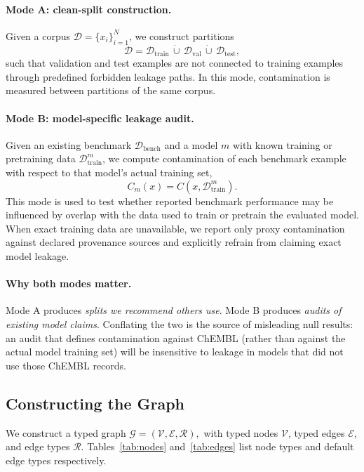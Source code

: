 \documentclass[11pt]{article}
\begin{document}
\paragraph{Mode A: clean-split construction.}
Given a corpus \(\mathcal{D} = \{x_i\}_{i=1}^{N}\), we construct partitions
\[
\mathcal{D}
=
\mathcal{D}_{\mathrm{train}}
\,\dot\cup\,
\mathcal{D}_{\mathrm{val}}
\,\dot\cup\,
\mathcal{D}_{\mathrm{test}},
\]
such that validation and test examples are not connected to training examples through predefined forbidden leakage paths. In this mode, contamination is measured between partitions of the same corpus.

\paragraph{Mode B: model-specific leakage audit.}
Given an existing benchmark \(\mathcal{D}_{\mathrm{bench}}\) and a model \(m\) with known training or pretraining data \(\mathcal{D}^{m}_{\mathrm{train}}\), we compute contamination of each benchmark example with respect to that model's actual training set,
\[
C_m(x) = C(x, \mathcal{D}^{m}_{\mathrm{train}}).
\]
This mode is used to test whether reported benchmark performance may be influenced by overlap with the data used to train or pretrain the evaluated model. When exact training data are unavailable, we report only proxy contamination against declared provenance sources and explicitly refrain from claiming exact model leakage.

\paragraph{Why both modes matter.}
Mode A produces \emph{splits we recommend others use}. Mode B produces \emph{audits of existing model claims}. Conflating the two is the source of misleading null results: an audit that defines contamination against ChEMBL (rather than against the actual model training set) will be insensitive to leakage in models that did not use those ChEMBL records.

\subsection{Constructing the Graph}

We construct a typed graph
\(
\mathcal{G} = (\mathcal{V}, \mathcal{E}, \mathcal{R}),
\)
with typed nodes \(\mathcal{V}\), typed edges \(\mathcal{E}\), and edge types \(\mathcal{R}\). Tables~\ref{tab:nodes} and~\ref{tab:edges} list node types and default edge types respectively.
\end{document}
